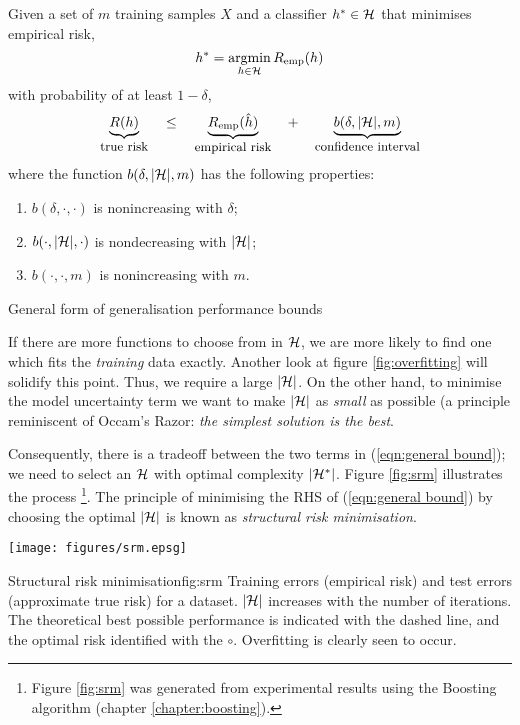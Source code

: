 \begin{linefigure}
Given a set of $m$ training samples $X$ and a classifier $h^{\ast} \in
\mathcal{H}$ that minimises empirical risk,
\begin{equation*}
h^{\ast} = \argmin_{h \in
\calH} R_{\emp}(h)
\end{equation*}
with probability of at least $1 - \delta$,
%
\begin{equation}
\underbrace{R(h)}_{\mbox{\small{true risk}}}
\quad \leq \quad
\underbrace{R_{\mathrm{emp}}(\hat{h})}_{\mbox{\small{empirical risk}}}
\quad + \quad
\underbrace{b(\delta, |\mathcal{H}|, m)}_{\mbox{\small{confidence interval}}}
\label{eqn:general bound}
\end{equation}
%
where the function $b(\delta, |\mathcal{H}|, m)$ has the following
properties:
%
\begin{enumerate}
\item	$b(\delta, \cdot, \cdot)$ is nonincreasing with $\delta$;
\item	$b(\cdot, |\mathcal{H}|, \cdot)$ is nondecreasing with $|\mathcal{H}|$;
\item	$b(\cdot, \cdot, m)$ is nonincreasing with $m$.
\end{enumerate}
\caption{General form of generalisation performance bounds}
\label{fig:generalisation bound form}
\end{linefigure}

If there are more functions to choose from in $\mathcal{H}$, we
are more likely to find one which fits the \emph{training} data
exactly.  Another look at figure \ref{fig:overfitting} will solidify
this point.  Thus, we require a large $|\mathcal{H}|$.  On the other hand,
to minimise the model uncertainty term we want to make $|\mathcal{H}|$ as
\emph{small} as possible (a principle reminiscent of Occam's Razor:
\emph{the simplest solution is the best}.

Consequently, there is a tradeoff between the two terms in
(\ref{eqn:general bound}); we need to select an $\mathcal{H}$ with optimal
complexity $|\mathcal{H}^{\ast}|$. Figure \ref{fig:srm} illustrates the
process%
\footnote{Figure \ref{fig:srm} was generated from experimental results
using the Boosting algorithm (chapter \ref{chapter:boosting}).}.
The principle of minimising the RHS of (\ref{eqn:general bound}) by
choosing the optimal $|\mathcal{H}|$ is known as \emph{structural risk
minimisation}.

\begin{linefigure}
\begin{center}
\texttt{[image: figures/srm.epsg]}
\end{center}
\begin{capt}{Structural risk minimisation}{fig:srm}
Training errors (empirical risk) and test errors (approximate true
risk) for a dataset.  $|\mathcal{H}|$ increases with the number of
iterations.  The theoretical best possible performance is
indicated with the dashed line, and the optimal risk identified with
the $\circ$.  Overfitting is clearly seen to occur.
\end{capt}
\end{linefigure}


